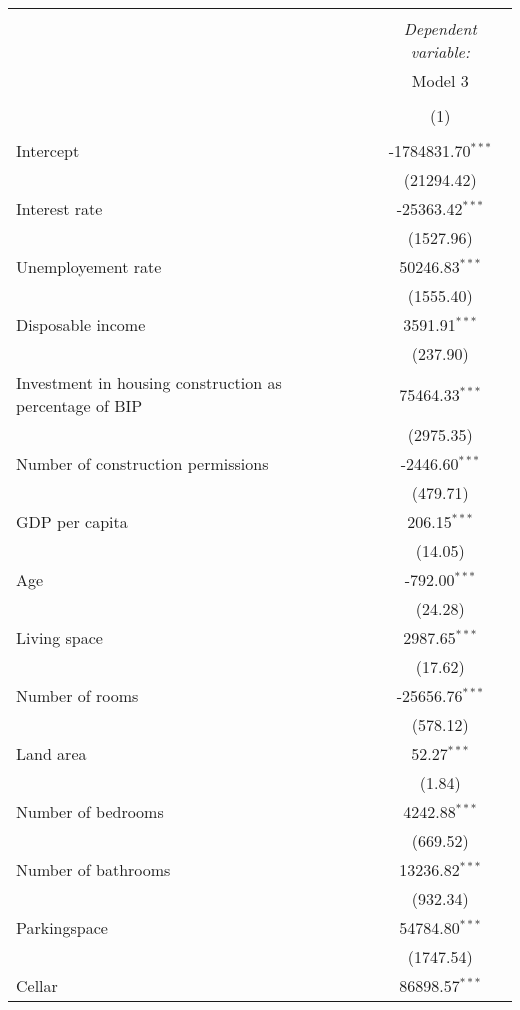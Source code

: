 \begin{table}[!htbp] \centering
\begin{tabular}{@{\extracolsep{5pt}}lc}
\\[-1.8ex]\hline
\hline \\[-1.8ex]
& \multicolumn{1}{c}{\textit{Dependent variable:}} \
\cr \cline{1-2}
\\[-1.8ex] & \multicolumn{1}{c}{Model 3} \\\\[-1.8ex] & (1) \\
\hline \\[-1.8ex]
 Intercept & -1784831.70$^{***}$ \\
  & (21294.42) \\
 Interest rate & -25363.42$^{***}$ \\
  & (1527.96) \\
 Unemployement rate & 50246.83$^{***}$ \\
  & (1555.40) \\
 Disposable income & 3591.91$^{***}$ \\
  & (237.90) \\
 Investment in housing construction as percentage of BIP & 75464.33$^{***}$ \\
  & (2975.35) \\
 Number of construction permissions & -2446.60$^{***}$ \\
  & (479.71) \\
 GDP per capita & 206.15$^{***}$ \\
  & (14.05) \\
 Age & -792.00$^{***}$ \\
  & (24.28) \\
 Living space & 2987.65$^{***}$ \\
  & (17.62) \\
 Number of rooms & -25656.76$^{***}$ \\
  & (578.12) \\
 Land area & 52.27$^{***}$ \\
  & (1.84) \\
 Number of bedrooms & 4242.88$^{***}$ \\
  & (669.52) \\
 Number of bathrooms & 13236.82$^{***}$ \\
  & (932.34) \\
 Parkingspace & 54784.80$^{***}$ \\
  & (1747.54) \\
 Cellar & 86898.57$^{***}$ \\

\end{tabular}
\end{table}
